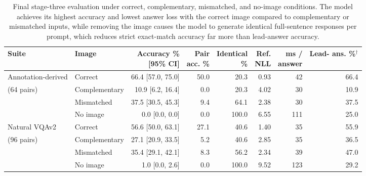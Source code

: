 \begin{table}[t]
\centering
\small
\caption{Final stage-three evaluation under correct, complementary, mismatched, and no-image conditions. The model achieves its highest accuracy and lowest answer loss with the correct image compared to complementary or mismatched inputs, while removing the image causes the model to generate identical full-sentence responses per prompt, which reduces strict exact-match accuracy far more than lead-answer accuracy.}
\label{tab:t2-final}
\begin{tabular}{llrrrrrr}
\toprule
Suite & Image & \makecell{Accuracy \%\\{}[95\% CI]} & \makecell{Pair\\acc. \%} & \makecell{Identical\\\%} & \makecell{Ref.\\NLL} & \makecell{ms /\\answer} & \makecell{Lead-\\ans. \%$^\dagger$} \\
\midrule
Annotation-derived & Correct & 66.4 [57.0, 75.0] & 50.0 & 20.3 & 0.93 & 42 & 66.4 \\
(64 pairs) & Complementary & 10.9 [6.2, 16.4] & 0.0 & 20.3 & 4.02 & 30 & 10.9 \\
 & Mismatched & 37.5 [30.5, 45.3] & 9.4 & 64.1 & 2.38 & 30 & 37.5 \\
 & No image & 0.0 [0.0, 0.0] & 0.0 & 100.0 & 6.55 & 111 & 25.0 \\
\midrule
Natural VQAv2 & Correct & 56.6 [50.0, 63.1] & 27.1 & 40.6 & 1.40 & 35 & 55.9 \\
(96 pairs) & Complementary & 27.1 [20.9, 33.5] & 5.2 & 40.6 & 2.85 & 35 & 36.5 \\
 & Mismatched & 35.4 [29.1, 42.1] & 8.3 & 56.2 & 2.34 & 39 & 47.0 \\
 & No image & 1.0 [0.0, 2.6] & 0.0 & 100.0 & 9.52 & 123 & 29.2 \\
\bottomrule
\end{tabular}
\end{table}
